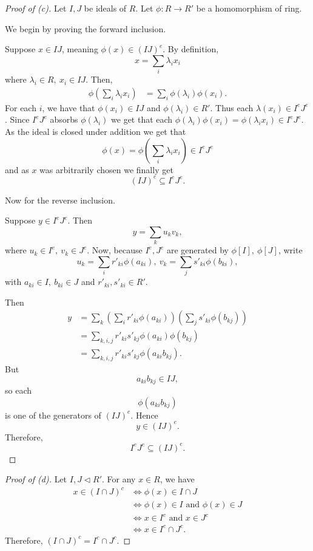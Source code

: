 \documentclass[11pt]{article}
\begin{document}
\begin{proof}[Proof of (c)]
    Let $I,J$ be ideals of $R$. Let $\phi : R \to R'$ be a 
    homomorphism of ring. 

    We begin by proving the forward inclusion. 

    Suppose $x \in IJ$, meaning $\phi(x) \in (IJ)^e$. 
    By definition, 
    \[
        x = \sum_{i} \lambda_ix_i
    \]
    where $\lambda_i \in R, \ x_i \in IJ$. 
    Then, 
    \begin{align*}
        \phi\left(\sum_i \lambda_i x_i\right)
        &= \sum_i \phi(\lambda_i)\phi(x_i).
    \end{align*}
    For each $i$, we have that $\phi(x_i) \in IJ$
    and $\phi(\lambda_i) \in R'$. 
    Thus each $\lambda(x_i) \in I^eJ^e$. Since $I^eJ^e$ absorbs
    $\phi(\lambda_i)$ we get that each 
    $\phi(\lambda_i)\phi(x_i) = \phi(\lambda_ix_i) \in I^eJ^e$.
    As the ideal is closed under addition we get that 
    \[
        \phi(x) = \phi\left(\sum_i \lambda_i x_i\right)
        \in I^eJ^e
    \]
    and as $x$ was arbitrarily chosen we finally get 
    \[ 
        (IJ)^e \subseteq I^eJ^e. 
    \]

    Now for the reverse inclusion.

    Suppose $y \in I^eJ^e$. Then 
    \[
        y = \sum_k u_k v_k, 
    \]
    where $u_k \in I^e, \ v_k \in J^e$. 
    Now, because $I^e, J^e$ are generated by 
    $\phi[I], \ \phi[J]$, write 
    \[
        u_k = \sum_i r'_{ki}\phi(a_{ki}), \ 
        v_k = \sum_j s'_{ki}\phi(b_{ki}), 
    \]
    with $a_{ki} \in I, \ b_{ki} \in J$ and 
    $r'_{ki}, s'_{ki} \in R'$. 

    Then 
    \begin{align*}
        y &= \sum_{k} \left(\sum_i r'_{ki}\phi(a_{ki})\right)
        \left(\sum_j s'_{ki}\phi(b_{kj})\right) \\ 
        &= \sum_{k,i,j}r'_{ki}s'_{kj}\phi(a_{ki})\phi(b_{kj}) \\
        &= \sum_{k,i,j}r'_{ki}s'_{kj}\phi(a_{ki}b_{kj}). 
    \end{align*}
    But 
    \[
        a_{ki}b_{kj} \in IJ, 
    \]
    so each 
    \[
        \phi(a_{ki}b_{kj})
    \]
    is one of the generators of $(IJ)^e$. Hence 
    \[
        y \in (IJ)^e. 
    \]
    Therefore, 
    \[
        I^eJ^e \subseteq (IJ)^e. 
    \]
\end{proof}
\begin{proof}[Proof of (d)]
    Let $I,J\triangleleft R'$. For any $x\in R$, we have
    \begin{align*}
    x\in (I\cap J)^c
    &\iff \phi(x)\in I\cap J\\
    &\iff \phi(x)\in I \text{ and } \phi(x)\in J\\
    &\iff x\in I^c \text{ and } x\in J^c \\
    &\iff x\in I^c\cap J^c.
    \end{align*}
    Therefore,
    \(        (I\cap J)^c=I^c\cap J^c.
       \)
\end{proof}
\end{document}
